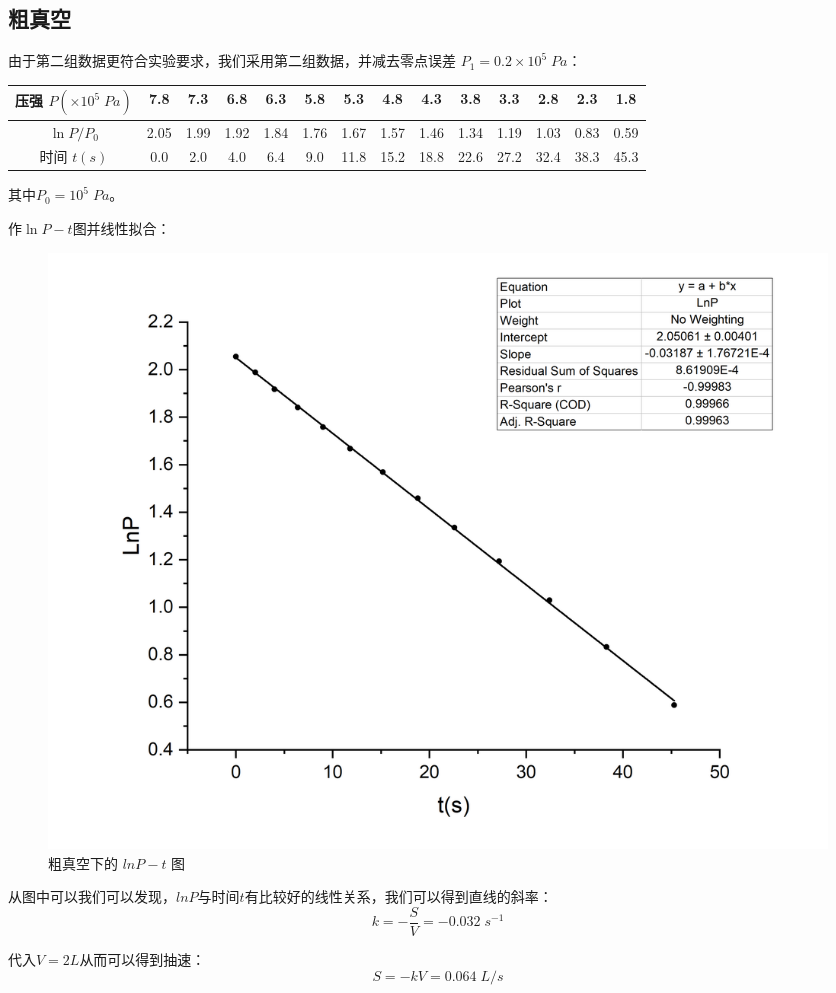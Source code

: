 \documentclass[UTF8]{ctexart}
\begin{document}
\subsection{粗真空}
由于第二组数据更符合实验要求，我们采用第二组数据，并减去零点误差 $P_1 = 0.2 \times 10 ^ 5 \; Pa$：
\begin{table}[!htbp]
	\centering
	\begin{tabular}{|c|c|c|c|c|c|c|c|c|c|c|c|c|c|}
		\hline
		压强 $P(\times10^5\;Pa)$ & 7.8 & 7.3 & 6.8 & 6.3 & 5.8 & 5.3 & 4.8 & 4.3 & 3.8 & 3.3 & 2.8 & 2.3 & 1.8 \\
		\hline
		$\ln{P/P_0}$ & 2.05 & 1.99 & 1.92 & 1.84 & 1.76 & 1.67 & 1.57 & 1.46 & 1.34 & 1.19 & 1.03 & 0.83 & 0.59 \\
		\hline
		时间 $t(s)$ & 0.0 & 2.0 & 4.0 & 6.4 & 9.0 & 11.8 & 15.2 & 18.8 & 22.6 & 27.2 & 32.4 & 38.3 & 45.3 \\
		\hline
	\end{tabular}
\end{table}
\par
其中$P_0 = 10^5 \; Pa$。
\par
作$\ln{P} - t $图并线性拟合：
\begin{figure}[htb]
	\centering
	\includegraphics[scale=0.45]{Graph4.png}
	\caption{粗真空下的 $lnP-t$ 图}
\end{figure}
\par
从图中可以我们可以发现，$lnP$与时间$t$有比较好的线性关系，我们可以得到直线的斜率：
$$ k = -\frac{S}{V} = -0.032 \; s^{-1}$$
\par
代入$V = 2L $从而可以得到抽速：
$$ S = -kV = 0.064 \; L/s $$
\end{document}
